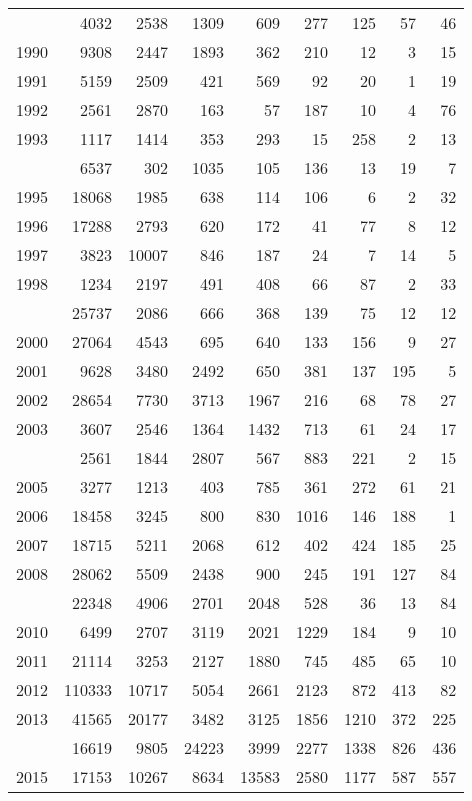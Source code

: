 \documentclass[
]{article}
\begin{document}
\begin{longtable}[t]{lrrrrrrrr}
\endfoot
\bottomrule
\endlastfoot
1989 & 4032 & 2538 & 1309 & 609 & 277 & 125 & 57 & 46\\
1990 & 9308 & 2447 & 1893 & 362 & 210 & 12 & 3 & 15\\
1991 & 5159 & 2509 & 421 & 569 & 92 & 20 & 1 & 19\\
1992 & 2561 & 2870 & 163 & 57 & 187 & 10 & 4 & 76\\
1993 & 1117 & 1414 & 353 & 293 & 15 & 258 & 2 & 13\\
\addlinespace
1994 & 6537 & 302 & 1035 & 105 & 136 & 13 & 19 & 7\\
1995 & 18068 & 1985 & 638 & 114 & 106 & 6 & 2 & 32\\
1996 & 17288 & 2793 & 620 & 172 & 41 & 77 & 8 & 12\\
1997 & 3823 & 10007 & 846 & 187 & 24 & 7 & 14 & 5\\
1998 & 1234 & 2197 & 491 & 408 & 66 & 87 & 2 & 33\\
\addlinespace
1999 & 25737 & 2086 & 666 & 368 & 139 & 75 & 12 & 12\\
2000 & 27064 & 4543 & 695 & 640 & 133 & 156 & 9 & 27\\
2001 & 9628 & 3480 & 2492 & 650 & 381 & 137 & 195 & 5\\
2002 & 28654 & 7730 & 3713 & 1967 & 216 & 68 & 78 & 27\\
2003 & 3607 & 2546 & 1364 & 1432 & 713 & 61 & 24 & 17\\
\addlinespace
2004 & 2561 & 1844 & 2807 & 567 & 883 & 221 & 2 & 15\\
2005 & 3277 & 1213 & 403 & 785 & 361 & 272 & 61 & 21\\
2006 & 18458 & 3245 & 800 & 830 & 1016 & 146 & 188 & 1\\
2007 & 18715 & 5211 & 2068 & 612 & 402 & 424 & 185 & 25\\
2008 & 28062 & 5509 & 2438 & 900 & 245 & 191 & 127 & 84\\
\addlinespace
2009 & 22348 & 4906 & 2701 & 2048 & 528 & 36 & 13 & 84\\
2010 & 6499 & 2707 & 3119 & 2021 & 1229 & 184 & 9 & 10\\
2011 & 21114 & 3253 & 2127 & 1880 & 745 & 485 & 65 & 10\\
2012 & 110333 & 10717 & 5054 & 2661 & 2123 & 872 & 413 & 82\\
2013 & 41565 & 20177 & 3482 & 3125 & 1856 & 1210 & 372 & 225\\
\addlinespace
2014 & 16619 & 9805 & 24223 & 3999 & 2277 & 1338 & 826 & 436\\
2015 & 17153 & 10267 & 8634 & 13583 & 2580 & 1177 & 587 & 557\\

\end{longtable}
\end{document}
